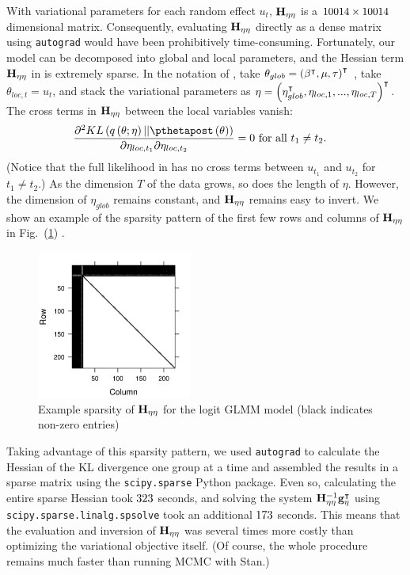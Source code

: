 \documentclass{article}\usepackage[]{graphicx}\usepackage[]{color}
\theoremstyle{plain}
\theoremstyle{definition}
\theoremstyle{plain}
\theoremstyle{plain}
\theoremstyle{plain}
\theoremstyle{plain}
\newcommand{\fig}[1]{Fig.~(\ref{fig:#1})}
\begin{document}
With variational parameters for each random effect $u_{t}$, $\mathbf{H}_{\eta\eta}$
is a $10014\times10014$ dimensional matrix. Consequently,
evaluating $\mathbf{H}_{\eta\eta}$ directly as a dense matrix using \texttt{autograd}
would have been prohibitively time-consuming. Fortunately, our model
can be decomposed into global and local parameters, and the Hessian
term $\mathbf{H}_{\eta\eta}$ in  is extremely sparse.
In the notation of , take $\theta_{glob}=\left(\beta^{\intercal},\mu,\tau\right)^{\intercal}$
, take $\theta_{loc,t}=u_{t}$, and stack the variational parameters
as $\eta=\left(\eta_{glob}^{\intercal},\eta_{loc,1},...,\eta_{loc,T}\right)^{\intercal}$.
The cross terms in $\mathbf{H}_{\eta\eta}$ between the local variables vanish:
\begin{align*}
\frac{\partial^{2}KL\left(q\left(\theta;\eta\right)||\pthetapost\left(\theta\right)\right)}{\partial\eta_{loc,t_{1}}\partial\eta_{loc,t_{2}}} & =0\textrm{ for all }t_{1}\ne t_{2}.
\end{align*}
(Notice that the full likelihood in 
has no cross terms between $u_{t_{1}}$ and $u_{t_{2}}$ for $t_{1}\ne t_{2}$.)
As the dimension $T$ of the data grows, so does the length of $\eta$.
However, the dimension of $\eta_{glob}$ remains constant, and $\mathbf{H}_{\eta\eta}$
remains easy to invert. We show an example of the sparsity pattern
of the first few rows and columns of $\mathbf{H}_{\eta\eta}$ in \fig{LogitGLMMHessianSparsity}
.

\begin{figure}[h]
\centering{}\includegraphics[width=2in]{0_home_rgiordan_Documents_git_repos_Covariances___BPaper_writing_static_images_logit_sparsity.png}\caption{Example sparsity of $\protect\mathbf{H}_{\eta\eta}$ for the logit GLMM model (black
indicates non-zero entries)}
\label{fig:LogitGLMMHessianSparsity}
\end{figure}
 

Taking advantage of this sparsity pattern, we used \texttt{autograd}
to calculate the Hessian of the KL divergence one group at a time
and assembled the results in a sparse matrix using the \texttt{scipy.sparse}
Python package. Even so, calculating the entire sparse Hessian took
$323$ seconds, and solving the system $\mathbf{H}_{\eta\eta}^{-1}\mathbf{g}_{\eta}^{\intercal}$
using \texttt{scipy.sparse.linalg.spsolve} took an additional $173$
seconds. This means that the evaluation and inversion of $\mathbf{H}_{\eta\eta}$
was several times more costly than optimizing the variational objective
itself. (Of course, the whole procedure remains much faster than running
MCMC with Stan.)
\end{document}
